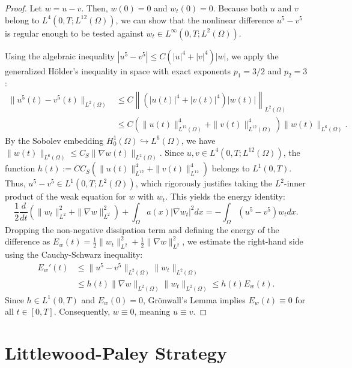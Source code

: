 \documentclass[11pt,letterpaper]{amsart}
\begin{document}
\begin{proof}
Let $w = u - v$. Then, $w(0) = 0$ and $w_t(0) = 0$. Because both $u$ and $v$ belong to $L^4(0,T; L^{12}(\Omega))$, we can show that the nonlinear difference $u^5 - v^5$ is regular enough to be tested against $w_t \in L^\infty(0,T; L^2(\Omega))$.

Using the algebraic inequality $|u^5 - v^5| \le C (|u|^4 + |v|^4) |w|$, we apply the generalized Hölder's inequality in space with exact exponents $p_1 = 3/2$ and $p_2 = 3$:
\begin{align*}
\|u^5(t) - v^5(t)\|_{L^2(\Omega)} &\le C \left\| (|u(t)|^4 + |v(t)|^4) |w(t)| \right\|_{L^2(\Omega)} \\
&\le C \left( \|u(t)\|_{L^{12}(\Omega)}^4 + \|v(t)\|_{L^{12}(\Omega)}^4 \right) \|w(t)\|_{L^6(\Omega)}.
\end{align*}
By the Sobolev embedding $H_0^1(\Omega) \hookrightarrow L^6(\Omega)$, we have $\|w(t)\|_{L^6(\Omega)} \le C_S \|\nabla w(t)\|_{L^2(\Omega)}$.
Since $u, v \in L^4(0,T; L^{12}(\Omega))$, the function $h(t) := C C_S \left( \|u(t)\|_{L^{12}}^4 + \|v(t)\|_{L^{12}}^4 \right)$ belongs to $L^1(0,T)$.
Thus, $u^5 - v^5 \in L^1(0,T; L^2(\Omega))$, which rigorously justifies taking the $L^2$-inner product of the weak equation for $w$ with $w_t$. This yields the energy identity:
\begin{equation}
\frac{1}{2}\frac{d}{dt} \left( \|w_t\|_{L^2}^2 + \|\nabla w\|_{L^2}^2 \right) + \int_\Omega a(x)|\nabla w_t|^2 dx = -\int_\Omega (u^5 - v^5) w_t dx.
\end{equation}
Dropping the non-negative dissipation term and defining the energy of the difference as $E_w(t) = \frac{1}{2}\|w_t\|_{L^2}^2 + \frac{1}{2}\|\nabla w\|_{L^2}^2$, we estimate the right-hand side using the Cauchy-Schwarz inequality:
\begin{align*}
E_w'(t) &\le \|u^5 - v^5\|_{L^2(\Omega)} \|w_t\|_{L^2(\Omega)} \\
&\le h(t) \|\nabla w\|_{L^2(\Omega)} \|w_t\|_{L^2(\Omega)} 
\le h(t) E_w(t).
\end{align*}
Since $h \in L^1(0,T)$ and $E_w(0) = 0$, Grönwall's Lemma implies $E_w(t) \equiv 0$ for all $t \in [0,T]$. Consequently, $w \equiv 0$, meaning $u \equiv v$.
\end{proof}

\section{Littlewood-Paley Strategy}
\end{document}
